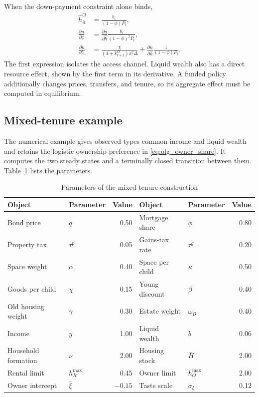 When the down-payment constraint alone binds,
\begin{equation}
\begin{aligned}
 \widehat h_{it}^O&=\frac{b_i}{(1-\phi)P_t},\\
 \frac{\partial n}{\partial\phi}
 &=\frac{\partial n}{\partial\widehat h}
 \frac{b_i}{(1-\phi)^2P_t},\\
 \frac{\partial n}{\partial b_i}
 &=\frac{\chi}{(1+k_{t+1}^O)x^2\Delta}
 +\frac{\partial n}{\partial\widehat h}
 \frac{1}{(1-\phi)P_t}.
\end{aligned}
 \label{eq:olg_app_financing_fertility_derivatives}
\end{equation}
The first expression isolates the access channel.  Liquid wealth also has a
direct resource effect, shown by the first term in its derivative.  A funded
policy additionally changes prices, transfers, and tenure, so its aggregate
effect must be computed in equilibrium.

\subsection{Mixed-tenure example}
\label{app:olg_computation}

The numerical example gives observed types common income and liquid wealth and
retains the logistic ownership preference in \eqref{eq:olg_owner_share}.  It
computes the two steady states and a terminally closed transition between them.
Table~\ref{tab:olg_app_parameters} lists the parameters.

\begin{table}[H]
\centering
\caption{Parameters of the mixed-tenure construction}
\label{tab:olg_app_parameters}
\footnotesize
\begin{tabular}{@{}llr@{\qquad}llr@{}}
\toprule
Object & Parameter & Value & Object & Parameter & Value\\
\midrule
Bond price & $q$ & 0.50 & Mortgage share & $\phi$ & 0.80\\
Property tax & $\tau^p$ & 0.05 & Gains-tax rate & $\tau^g$ & 0.20\\
Space weight & $\alpha$ & 0.40 & Space per child & $\kappa$ & 0.50\\
Goods per child & $\chi$ & 0.15 & Young discount & $\beta$ & 0.40\\
Old housing weight & $\gamma$ & 0.30 & Estate weight & $\omega_B$ & 0.40\\
Income & $y$ & 1.00 & Liquid wealth & $b$ & 0.06\\
Household formation & $\nu$ & 2.00 & Housing stock & $\bar H$ & 2.00\\
Rental limit & $h_R^{\max}$ & 0.45 & Owner limit & $h_O^{\max}$ & 2.00\\
Owner intercept & $\bar\xi$ & $-0.15$ & Taste scale & $\sigma_\xi$ & 0.12\\
\bottomrule
\end{tabular}
\end{table}

